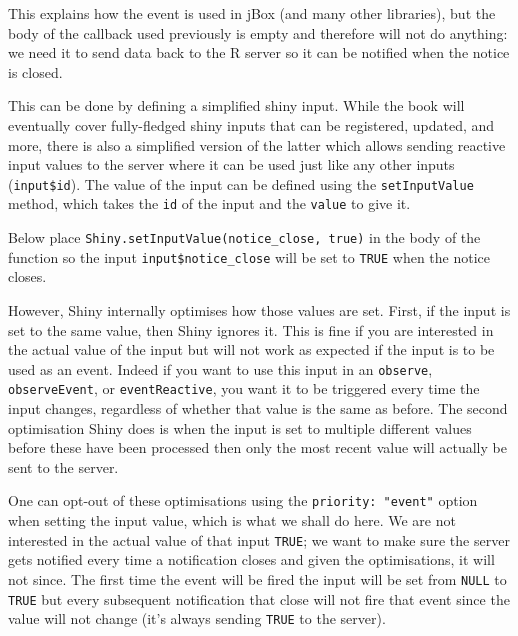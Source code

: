 \documentclass[
  10pt,
]{krantz}
\makeatletter
\newenvironment{Shaded}{\begin{snugshade}}{\end{snugshade}}
\newcommand{\KeywordTok}[1]{\textcolor[rgb]{0.27,0.27,0.27}{\textbf{#1}}}
\newcommand{\NormalTok}[1]{#1}
\newcommand{\OperatorTok}[1]{\textcolor[rgb]{0.43,0.43,0.43}{\textbf{#1}}}
\newcommand{\StringTok}[1]{\textcolor[rgb]{0.5,0.5,0.5}{#1}}
\newenvironment{kframe}{%
\medskip{}
\setlength{\fboxsep}{.8em}
 \def\at@end@of@kframe{}%
 \ifinner\ifhmode%
  \def\at@end@of@kframe{\end{minipage}}%
  \begin{minipage}{\columnwidth}%
 \fi\fi%
 \def\FrameCommand##1{\hskip\@totalleftmargin \hskip-\fboxsep
 \colorbox{shadecolor}{##1}\hskip-\fboxsep
     \hskip-\linewidth \hskip-\@totalleftmargin \hskip\columnwidth}%
 \MakeFramed {\advance\hsize-\width
   \@totalleftmargin\z@ \linewidth\hsize
   \@setminipage}}%
 {\par\unskip\endMakeFramed%
 \at@end@of@kframe}
\renewenvironment{Shaded}{\begin{kframe}}{\end{kframe}}
\makeatother
\begin{document}
This explains how the event is used in jBox (and many other libraries), but the body of the callback used previously is empty and therefore will not do anything: we need it to send data back to the R server so it can be notified when the notice is closed.

This can be done by defining a simplified shiny input. While the book will eventually cover fully-fledged shiny inputs that can be registered, updated, and more, there is also a simplified version of the latter which allows sending reactive input values to the server where it can be used just like any other inputs (\texttt{input\$id}). The value of the input can be defined using the \texttt{setInputValue} method, which takes the \texttt{id} of the input and the \texttt{value} to give it.

Below place \texttt{Shiny.setInputValue(\textquotesingle{}notice\_close\textquotesingle{},\ true)} in the body of the function so the input \texttt{input\$notice\_close} will be set to \texttt{TRUE} when the notice closes.

\begin{Shaded}
\end{Shaded}

However, Shiny internally optimises how those values are set. First, if the input is set to the same value, then Shiny ignores it. This is fine if you are interested in the actual value of the input but will not work as expected if the input is to be used as an event. Indeed if you want to use this input in an \texttt{observe}, \texttt{observeEvent}, or \texttt{eventReactive}, you want it to be triggered every time the input changes, regardless of whether that value is the same as before. The second optimisation Shiny does is when the input is set to multiple different values before these have been processed then only the most recent value will actually be sent to the server.

One can opt-out of these optimisations using the \texttt{priority:\ "event"} option when setting the input value, which is what we shall do here. We are not interested in the actual value of that input \texttt{TRUE}; we want to make sure the server gets notified every time a notification closes and given the optimisations, it will not since. The first time the event will be fired the input will be set from \texttt{NULL} to \texttt{TRUE} but every subsequent notification that close will not fire that event since the value will not change (it's always sending \texttt{TRUE} to the server).
\end{document}
